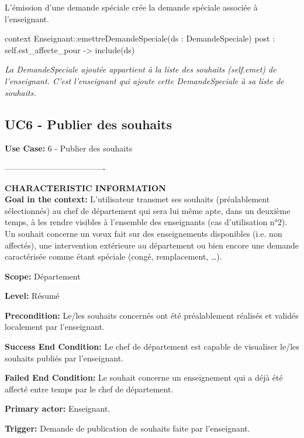  \indent L'émission d'une demande spéciale crée la demande spéciale associée à l'enseignant.

 \begin{ocl}
 context Enseignant::emettreDemandeSpeciale(ds : DemandeSpeciale)
 post : self.est_affecte_pour -> include(ds)
 \end{ocl}
 \emph{La DemandeSpeciale ajoutée appartient à la liste des souhaits (self.emet) de l'enseignant. C'est l'enseignant qui ajoute cette DemandeSpeciale à sa liste de souhaits.}



 \subsection{UC6 - Publier des souhaits}

 \noindent\textbf{Use Case:} 6 - Publier des souhaits

 \noindent\--------------------------------------

 \noindent\textbf{CHARACTERISTIC INFORMATION}\\

 \noindent \textbf{Goal in the context:}
 L'utilisateur transmet ses souhaits (préalablement sélectionnés) au chef de département qui sera lui même apte, dans un deuxième temps, à les rendre visibles à l'ensemble des enseignants (cas d'utilisation n°2).
 Un souhait concerne un vœux fait sur des enseignements disponibles (i.e. non affectés), une intervention extérieure au département ou bien encore une demande caractérisée comme étant spéciale (congé, remplacement, \dots). 


 \noindent\textbf{Scope:}
 Département

 \noindent\textbf{Level:}
 Résumé

 \noindent\textbf{Precondition:}
 Le/les souhaits concernés ont été préalablement réalisés et validés localement par l'enseignant.

 \noindent\textbf{Success End Condition:}
 Le chef de département est capable de visualiser le/les souhaits publiés par l'enseignant.

 \noindent\textbf{Failed End Condition:}
 Le souhait concerne un enseignement qui a déjà été affecté entre temps par le chef de département.

 \noindent\textbf{Primary actor:}
 Enseignant.

 \noindent\textbf{Trigger:}
 Demande de publication de souhaits faite par l'enseignant.\\
 

